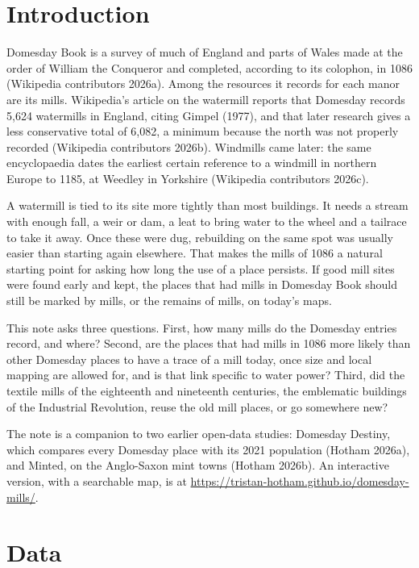 \documentclass[11pt,a4paper]{article}
\begin{document}
\section{Introduction}

Domesday Book is a survey of much of England and parts of Wales made at the order of William the Conqueror and completed, according to its colophon, in 1086 (Wikipedia contributors 2026a). Among the resources it records for each manor are its mills. Wikipedia's article on the watermill reports that Domesday records 5,624 watermills in England, citing Gimpel (1977), and that later research gives a less conservative total of 6,082, a minimum because the north was not properly recorded (Wikipedia contributors 2026b). Windmills came later: the same encyclopaedia dates the earliest certain reference to a windmill in northern Europe to 1185, at Weedley in Yorkshire (Wikipedia contributors 2026c).

A watermill is tied to its site more tightly than most buildings. It needs a stream with enough fall, a weir or dam, a leat to bring water to the wheel and a tailrace to take it away. Once these were dug, rebuilding on the same spot was usually easier than starting again elsewhere. That makes the mills of 1086 a natural starting point for asking how long the use of a place persists. If good mill sites were found early and kept, the places that had mills in Domesday Book should still be marked by mills, or the remains of mills, on today's maps.

This note asks three questions. First, how many mills do the Domesday entries record, and where? Second, are the places that had mills in 1086 more likely than other Domesday places to have a trace of a mill today, once size and local mapping are allowed for, and is that link specific to water power? Third, did the textile mills of the eighteenth and nineteenth centuries, the emblematic buildings of the Industrial Revolution, reuse the old mill places, or go somewhere new?

The note is a companion to two earlier open-data studies: Domesday Destiny, which compares every Domesday place with its 2021 population (Hotham 2026a), and Minted, on the Anglo-Saxon mint towns (Hotham 2026b). An interactive version, with a searchable map, is at \url{https://tristan-hotham.github.io/domesday-mills/}.

\section{Data}
\end{document}
